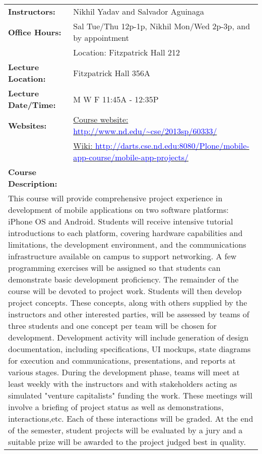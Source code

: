 \begin{center}
\begin{longtable}{ p{} p{} }
\textbf{Instructors:} & Nikhil Yadav and Salvador Aguinaga \\
\textbf{Office Hours:} & Sal Tue/Thu 12p-1p, Nikhil Mon/Wed 2p-3p, and by appointment\\
& Location: Fitzpatrick Hall 212 \\
\textbf{Lecture Location:} & Fitzpatrick Hall 356A \\
\textbf{Lecture Date/Time:} & M W F 11:45A - 12:35P\\
\textbf{Websites:} & \href{http://www.nd.edu/~cse/2013sp/60333/}
{Course website: 
\textcolor{blue}{\url{http://www.nd.edu/~cse/2013sp/60333/}}}\\
				   & \href{http://darts.cse.nd.edu:8080/Plone/mobile-app-course/mobile-app-projects/}{Wiki: 
\textcolor{blue}{\url{http://darts.cse.nd.edu:8080/Plone/mobile-app-course/mobile-app-projects/}}}\\
\textbf{Course Description:} & \\
\multicolumn{2}{p{1\textwidth}}{\small This course will provide comprehensive project experience in development of mobile applications on two software platforms: iPhone OS and Android. Students will receive intensive tutorial introductions to each platform, covering hardware capabilities and limitations, the development environment, and the communications infrastructure available on campus to support networking. A few programming exercises will be assigned so that students can demonstrate basic development proficiency. The remainder of the course will be devoted to project work. Students will then develop project concepts. These concepts, along with others supplied by the instructors and other interested parties, will be assessed by teams of three students and one concept per team will be chosen for development. Development activity will include generation of design documentation, including specifications, UI mockups, state diagrams for execution and communications, presentations, and reports at various stages. During the development phase, teams will meet at least weekly with the instructors and with stakeholders acting as simulated "venture capitalists" funding the work. These meetings will involve a briefing of project status as well as demonstrations, interactions,etc. Each of these interactions will be graded. At the end of the semester, student projects will be evaluated by a jury and a suitable prize will be awarded to the project judged best in quality.} \\


\end{longtable}
\end{center}
